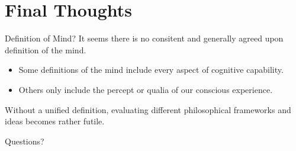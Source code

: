 \documentclass[aspectratio=1610]{beamer}
\begin{document}

\section{Final Thoughts}


\begin{frame}{Definition of Mind?}
	It seems there is no consitent and generally agreed upon definition of the \alert{mind}.

	\pause
	\vspace{2em}

	\begin{itemize}
		\item Some definitions of the mind include every aspect of cognitive capability.
		\pause
		\item Others only include the percept or \alert{qualia} of our conscious experience.
	\end{itemize}

	\pause
	\vspace{2em}

	Without a unified definition, evaluating different philosophical frameworks and ideas becomes rather futile.
\end{frame}


\begin{frame}[standout]
	Questions?
\end{frame}
\end{document}
